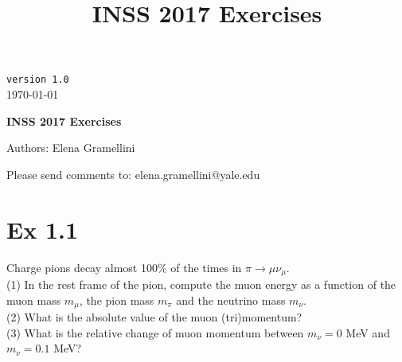 \documentclass[a4paper]{article}
\title{INSS 2017 Exercises}
\begin{document}
\def\Journal#1#2#3#4{{#1} {\bf #2}, #3 (#4)}
\def\etal{{\it et\ al.}}
\def\numunue{\nu_\mu\rightarrow\nu_e}
\def\numunutau{\nu_\mu\rightarrow\nu_\tau}
\def\nuebar{\bar\nu_e}
\def\nue{\nu_e}
\def\nutau{\nu_\tau}
\def\numubar{\bar\nu_\mu}
\def\numu{\nu_\mu}
\def\ra{\rightarrow}
\def\numubarnuebar{\bar\nu_\mu\rightarrow\bar\nu_e}
\def\nuebarnumubar{\bar\nu_e\rightarrow\bar\nu_\mu}
\def\osc{\rightsquigarrow}
\def\inteni{{\cal I}_{pot}}
\def\fmerit{{\cal F}}
\begin{flushright}
{\tt version 1.0}\\ 
\today
\end{flushright}
\vspace*{0.6cm}
\linenumbers
\begin{center}
{\Large \bf INSS 2017 Exercises} 
\vspace*{1.6cm}
\setcounter{footnote}{0}  
\def\A{\kern+.6ex\lower.42ex\hbox{$\scriptstyle \iota$}\kern-1.20ex a}
\def\E{\kern+.5ex\lower.42ex\hbox{$\scriptstyle \iota$}\kern-1.10ex e}
\small
\newcommand{\Aname}[2]{#1}
\def\titlefoot#1{\vspace{-0.3cm}\begin{center}{\bf #1}\end{center}}

Authors: Elena Gramellini\\

\end{center}
\vspace*{1cm}

\noindent Please send comments to: elena.gramellini@yale.edu


\tableofcontents

\newpage
\section{Ex 1.1}
Charge pions decay almost 100\% of the times in $\pi\rightarrow\mu\nu_{\mu}$. \\
(1) In the rest frame of the pion, compute the muon energy as a function of the muon mass $m_{\mu}$, the pion mass $m_{\pi}$ and the neutrino mass $m_{\nu}$.\\
(2) What is the absolute value of the muon (tri)momentum?\\
(3) What is the relative change of muon momentum between $m_{\nu} = 0$ MeV and $m_{\nu} = 0.1$ MeV?\\
\end{document}
